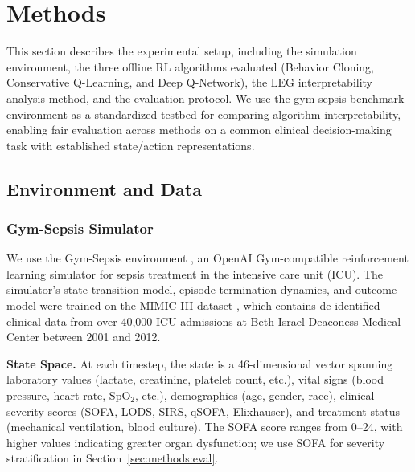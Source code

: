 
\section{Methods}\label{sec:methods}

This section describes the experimental setup, including the simulation environment, the three offline RL algorithms evaluated (Behavior Cloning, Conservative Q-Learning, and Deep Q-Network), the LEG interpretability analysis method, and the evaluation protocol. We use the gym-sepsis benchmark environment \citep{raghu2017sepsis_drl} as a standardized testbed for comparing algorithm interpretability, enabling fair evaluation across methods on a common clinical decision-making task with established state/action representations.

\subsection{Environment and Data}\label{sec:methods:env}

\subsubsection{Gym-Sepsis Simulator}

We use the Gym-Sepsis environment \citep{raghu2017sepsis_drl}, an OpenAI Gym-compatible reinforcement learning simulator for sepsis treatment in the intensive care unit (ICU). The simulator's state transition model, episode termination dynamics, and outcome model were trained on the MIMIC-III dataset \citep{johnson2016mimic3}, which contains de-identified clinical data from over 40,000 ICU admissions at Beth Israel Deaconess Medical Center between 2001 and 2012.

\textbf{State Space.} At each timestep, the state is a 46-dimensional vector spanning laboratory values (lactate, creatinine, platelet count, etc.), vital signs (blood pressure, heart rate, SpO$_2$, etc.), demographics (age, gender, race), clinical severity scores (SOFA, LODS, SIRS, qSOFA, Elixhauser), and treatment status (mechanical ventilation, blood culture). The SOFA score \citep{vincent1996sofa} ranges from 0--24, with higher values indicating greater organ dysfunction; we use SOFA for severity stratification in Section~\ref{sec:methods:eval}.

